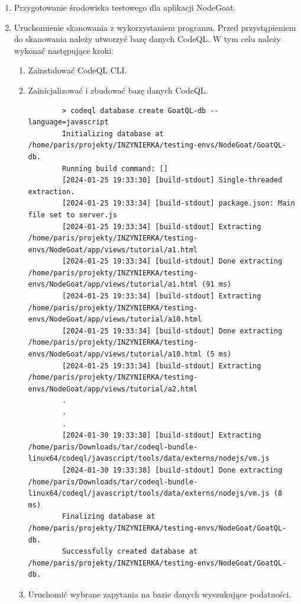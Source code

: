 \begin{enumerate}
    \item Przygotowanie środowiska testowego dla aplikacji NodeGoat.
    
    

    \item Uruchomienie skanowania z wykorzystaniem programu.
    Przed przystąpieniem do skanowania należy utworzyć bazę danych CodeQL. W tym celu należy wykonać następujące kroki:
    \begin{enumerate}
        \item Zainstalować CodeQL CLI.
        \item Zainicjalizować i zbudować bazę danych CodeQL.
        \begin{verbatim}
        > codeql database create GoatQL-db --language=javascript  
        Initializing database at /home/paris/projekty/INZYNIERKA/testing-envs/NodeGoat/GoatQL-db.
        Running build command: []
        [2024-01-25 19:33:30] [build-stdout] Single-threaded extraction.
        [2024-01-25 19:33:34] [build-stdout] package.json: Main file set to server.js
        [2024-01-25 19:33:34] [build-stdout] Extracting /home/paris/projekty/INZYNIERKA/testing-envs/NodeGoat/app/views/tutorial/a1.html
        [2024-01-25 19:33:34] [build-stdout] Done extracting /home/paris/projekty/INZYNIERKA/testing-envs/NodeGoat/app/views/tutorial/a1.html (91 ms)
        [2024-01-25 19:33:34] [build-stdout] Extracting /home/paris/projekty/INZYNIERKA/testing-envs/NodeGoat/app/views/tutorial/a10.html
        [2024-01-25 19:33:34] [build-stdout] Done extracting /home/paris/projekty/INZYNIERKA/testing-envs/NodeGoat/app/views/tutorial/a10.html (5 ms)
        [2024-01-25 19:33:34] [build-stdout] Extracting /home/paris/projekty/INZYNIERKA/testing-envs/NodeGoat/app/views/tutorial/a2.html
        .
        .
        .
        [2024-01-30 19:33:38] [build-stdout] Extracting /home/paris/Downloads/tar/codeql-bundle-linux64/codeql/javascript/tools/data/externs/nodejs/vm.js
        [2024-01-30 19:33:38] [build-stdout] Done extracting /home/paris/Downloads/tar/codeql-bundle-linux64/codeql/javascript/tools/data/externs/nodejs/vm.js (8 ms)
        Finalizing database at /home/paris/projekty/INZYNIERKA/testing-envs/NodeGoat/GoatQL-db.
        Successfully created database at /home/paris/projekty/INZYNIERKA/testing-envs/NodeGoat/GoatQL-db.
        \end{verbatim}

        \item Uruchomić wybrane zapytania na bazie danych wyszukujące podatności.
        

\end{enumerate}
\end{enumerate}
